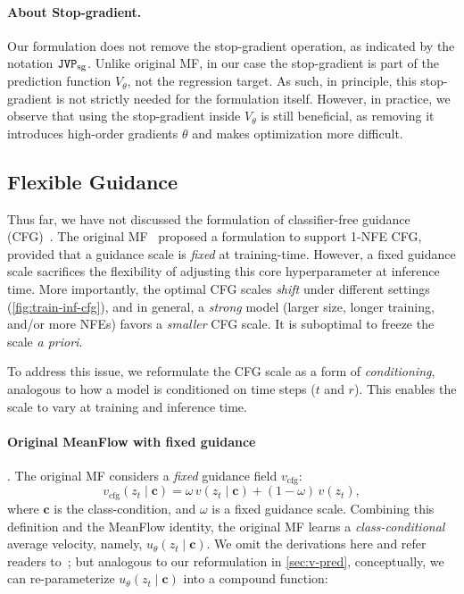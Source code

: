 \paragraph{About Stop-gradient.} Our formulation does not remove the stop-gradient operation, as indicated by the notation $\mathtt{JVP}_\textrm{sg}$. Unlike original MF, in our case the stop-gradient is part of the prediction function $V_\theta$, not the regression target. As such, in principle, this stop-gradient is not strictly needed for the formulation itself. However, in practice, we observe that using the stop-gradient inside $V_\theta$ is still beneficial, as removing it introduces high-order gradients \wrt $\theta$ and makes optimization more difficult. 

\subsection{Flexible Guidance}
\label{sec:method-cfg}

Thus far, we have not discussed the formulation of classifier-free guidance (CFG)~\cite{cfg}. 
The original MF~\cite{mf} proposed a formulation to support 1-NFE CFG, provided that a guidance scale is \textit{fixed} at training-time.
However, a fixed guidance scale sacrifices the flexibility of adjusting this core hyperparameter at inference time. More importantly, the optimal CFG scales \textit{shift} under different settings (\cref{fig:train-inf-cfg}), and in general, a \textit{strong} model (\eg larger size, longer training, and/or more NFEs) favors a \textit{smaller} CFG scale. It is suboptimal to freeze the scale \textit{a priori}.

To address this issue, we reformulate the CFG scale as a form of \textit{conditioning}, analogous to how a model is conditioned on time steps (\eg $t$ and $r$). This enables the scale to vary at training and inference time.

\paragraph{Original MeanFlow with fixed guidance}. 
The original MF \cite{mf} considers a \textit{fixed} guidance field $v_{\text{cfg}}$: 
\begin{equation}
    \label{eq:cfg}
       v_{\text{cfg}}(z_t\mid\mathbf{c}) = \omega\,v(z_t\mid\mathbf{c}) + (1-\omega)\,v(z_t),
\end{equation}
where $\mathbf{c}$ is the class-condition, and $\omega$ is a fixed guidance scale.
Combining this definition and the MeanFlow identity, the original MF learns a \textit{class-conditional} average velocity, namely, $u_{\theta}(z_t\mid\mathbf{c})$. We omit the derivations here and refer readers to~\cite{mf}; but analogous to our reformulation in \cref{sec:v-pred}, conceptually, we can re-parameterize $u_{\theta}(z_t\mid\mathbf{c})$ into a compound function: 

